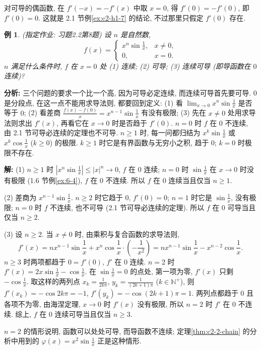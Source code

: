 \documentclass[UTF8,openany]{ctexbook}
\theoremstyle{chinesetextbook}
\newtheorem{example}{例}[section]
\newenvironment{cnsolution}{\par\indent\textbf{解:} \ignorespaces}{\par}
\begin{document}
对可导的偶函数, 在 $f'(-x)=-f'(x)$ 中取 $x=0$, 得 $f'(0)=-f'(0)$, 即 $f'(0)=0$. 这就是 2.1 节例\ref{ex:c2-h1-7} 的结论, 不过那里只假定 $f'(0)$ 存在.
\begin{example}\label{ex:c2-h2-8}
\textnormal{(指定作业: 习题2.2第8题)} 设 $n$ 是自然数,
\[
f(x)=\begin{cases}x^n\sin\frac1x,&x\ne0,\\0,&x=0.\end{cases}
\]
$n$ 满足什么条件时, $f$ 在 $x=0$ 处 (1) 连续; (2) 可导; (3) 连续可导 (即导函数在 $0$ 连续)?
\end{example}
\par\indent\textbf{分析:} 三个问题的要求一个比一个高, 因为可导必定连续, 而连续可导首先要可导. $0$ 是分段点, 在这一点不能用求导法则, 都要回到定义: (1) 看 $\displaystyle\lim_{x\to0}x^n\sin\frac1x$ 是否等于 $0$; (2) 看差商 $\displaystyle\frac{f(x)-f(0)}x=x^{n-1}\sin\frac1x$ 有没有极限; (3) 先在 $x\ne0$ 处用求导法则求出 $f'(x)$, 再看它在 $x\to0$ 时是否趋于 $f'(0)$. $n=0$ 时 $f$ 在 $0$ 不连续, 由 2.1 节可导必连续的定理也不可导. $n\ge1$ 时, 每一问都归结为 $\displaystyle x^k\sin\frac1x$ 或 $\displaystyle x^k\cos\frac1x$ ($k\ge0$) 的极限. $k\ge1$ 时它是有界函数与无穷小之积, 趋于 $0$; $k=0$ 时极限不存在.
\begin{cnsolution}
(1) $n\ge1$ 时 $\displaystyle\left|x^n\sin\frac1x\right|\le|x|^n\to0$, $f$ 在 $0$ 连续; $n=0$ 时 $\displaystyle\sin\frac1x$ 在 $x\to0$ 时没有极限 (1.6 节例\ref{ex:6-4}), $f$ 在 $0$ 不连续. 所以 $f$ 在 $0$ 连续当且仅当 $n\ge1$.

(2) 差商为 $\displaystyle x^{n-1}\sin\frac1x$. $n\ge2$ 时它趋于 $0$, $f'(0)=0$; $n=1$ 时它是 $\displaystyle\sin\frac1x$, 没有极限; $n=0$ 时 $f$ 不连续, 也不可导 (2.1 节可导必连续的定理). 所以 $f$ 在 $0$ 可导当且仅当 $n\ge2$.

(3) 设 $n\ge2$. 当 $x\ne0$ 时, 由乘积与复合函数的求导法则,
\[
f'(x)=nx^{n-1}\sin\frac1x+x^n\cos\frac1x\cdot\left(-\frac1{x^2}\right)=nx^{n-1}\sin\frac1x-x^{n-2}\cos\frac1x.
\]
$n\ge3$ 时两项都趋于 $0=f'(0)$, $f'$ 在 $0$ 连续. $n=2$ 时 $\displaystyle f'(x)=2x\sin\frac1x-\cos\frac1x$. 在 $\displaystyle\sin\frac1x=0$ 的点处, 第一项为零, $f'(x)$ 只剩 $\displaystyle-\cos\frac1x$. 取这样的两列点 $\displaystyle x_k=\frac1{2k\pi}$, $\displaystyle y_k=\frac1{(2k+1)\pi}$ ($k\in\mathbb N^+$), 则 $f'(x_k)=-\cos2k\pi=-1$, $f'(y_k)=-\cos(2k+1)\pi=1$. 两列点都趋于 $0$ 且各项不为零, 由海涅定理, $x\to0$ 时 $f'(x)$ 没有极限, 所以 $n=2$ 时 $f'$ 在 $0$ 不连续. 综上, $f$ 在 $0$ 连续可导当且仅当 $n\ge3$.
\end{cnsolution}
$n=2$ 的情形说明, 函数可以处处可导, 而导函数不连续; 定理\ref{thm:c2-2-chain} 的分析中用到的 $\displaystyle\varphi(x)=x^2\sin\frac1x$ 正是这种情形.
\end{document}
